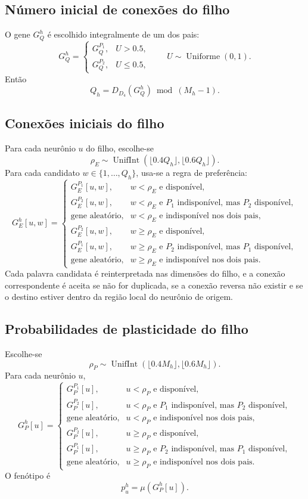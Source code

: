 \documentclass[12pt,a4paper,fleqn]{article}
\newcommand{\UnifInt}{\operatorname{UnifInt}}
\begin{document}
\subsection{Número inicial de conexões do filho}

O gene $G_Q^h$ é escolhido integralmente de um dos pais:
$$
	G_Q^h=
	\begin{cases}
		G_Q^{P_1}, & U>0.5,\\
		G_Q^{P_2}, & U\leq0.5,
	\end{cases}
	\qquad U\sim\operatorname{Uniforme}(0,1).
$$
Então
$$
	Q_h=D_{D_4}(G_Q^h)\bmod(M_h-1).
$$

\subsection{Conexões iniciais do filho}

Para cada neurônio $u$ do filho, escolhe-se
$$
	\rho_E\sim\UnifInt(\lfloor0.4Q_h\rfloor,\lfloor0.6Q_h\rfloor).
$$
Para cada candidato $w\in\{1,\ldots,Q_h\}$, usa-se a regra de preferência:
$$
	G_E^h[u,w]=
	\begin{cases}
		G_E^{P_1}[u,w], & w<\rho_E\text{ e disponível},\\
		G_E^{P_2}[u,w], & w<\rho_E\text{ e }P_1\text{ indisponível, mas }P_2\text{ disponível},\\
		\text{gene aleatório}, & w<\rho_E\text{ e indisponível nos dois pais},\\
		G_E^{P_2}[u,w], & w\geq\rho_E\text{ e disponível},\\
		G_E^{P_1}[u,w], & w\geq\rho_E\text{ e }P_2\text{ indisponível, mas }P_1\text{ disponível},\\
		\text{gene aleatório}, & w\geq\rho_E\text{ e indisponível nos dois pais}.
	\end{cases}
$$
Cada palavra candidata é reinterpretada nas dimensões do filho, e a conexão correspondente é aceita se não for duplicada, se a conexão reversa não existir e se o destino estiver dentro da região local do neurônio de origem.

\subsection{Probabilidades de plasticidade do filho}

Escolhe-se
$$
	\rho_P\sim\UnifInt(\lfloor0.4M_h\rfloor,\lfloor0.6M_h\rfloor).
$$
Para cada neurônio $u$,
$$
	G_P^h[u]=
	\begin{cases}
		G_P^{P_1}[u], & u<\rho_P\text{ e disponível},\\
		G_P^{P_2}[u], & u<\rho_P\text{ e }P_1\text{ indisponível, mas }P_2\text{ disponível},\\
		\text{gene aleatório}, & u<\rho_P\text{ e indisponível nos dois pais},\\
		G_P^{P_2}[u], & u\geq\rho_P\text{ e disponível},\\
		G_P^{P_1}[u], & u\geq\rho_P\text{ e }P_2\text{ indisponível, mas }P_1\text{ disponível},\\
		\text{gene aleatório}, & u\geq\rho_P\text{ e indisponível nos dois pais}.
	\end{cases}
$$
O fenótipo é
$$
	p_u^h=\mu(G_P^h[u]).
$$
\end{document}
